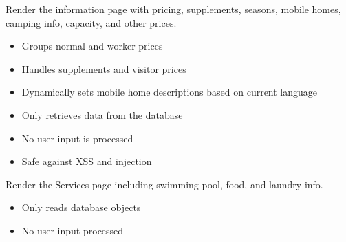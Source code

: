 \documentclass[letterpaper,10pt,english]{sphinxmanual}
\begin{document}

\begin{fulllineitems}
\label{\detokenize{index:core.views.infos_view}}
\pysigstartsignatures
\pysiglinewithargsret
{}
{}
{}
\pysigstopsignatures
\sphinxAtStartPar
Render the information page with pricing, supplements, seasons, mobile homes,
camping info, capacity, and other prices.
\begin{description}
\begin{itemize}
\item {} 
\sphinxAtStartPar
Groups normal and worker prices

\item {} 
\sphinxAtStartPar
Handles supplements and visitor prices

\item {} 
\sphinxAtStartPar
Dynamically sets mobile home descriptions based on current language

\end{itemize}

\begin{itemize}
\item {} 
\sphinxAtStartPar
Only retrieves data from the database

\item {} 
\sphinxAtStartPar
No user input is processed

\item {} 
\sphinxAtStartPar
Safe against XSS and injection

\end{itemize}

\end{description}

\end{fulllineitems}


\begin{fulllineitems}
\label{\detokenize{index:core.views.services_view}}
\pysigstartsignatures
\pysiglinewithargsret
{}
{}
{}
\pysigstopsignatures
\sphinxAtStartPar
Render the Services page including swimming pool, food, and laundry info.
\begin{description}
\begin{itemize}
\item {} 
\sphinxAtStartPar
Only reads database objects

\item {} 
\sphinxAtStartPar
No user input processed

\end{itemize}

\end{description}

\end{fulllineitems}
\end{document}
